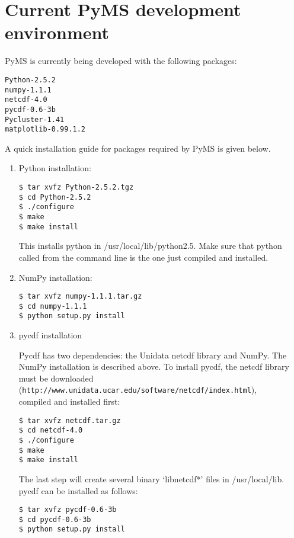 \section{Current PyMS development environment}

PyMS is currently being developed with the following packages:

\begin{verbatim}
Python-2.5.2
numpy-1.1.1
netcdf-4.0
pycdf-0.6-3b
Pycluster-1.41
matplotlib-0.99.1.2
\end{verbatim}

A quick installation guide for packages required by PyMS is given below.

\begin{enumerate}

\item Python installation:

\begin{verbatim}
$ tar xvfz Python-2.5.2.tgz
$ cd Python-2.5.2
$ ./configure
$ make
$ make install
\end{verbatim}

\noindent
This installs python in /usr/local/lib/python2.5.  Make sure that python called
from the command line is the one just compiled and installed.

\item NumPy installation:

\begin{verbatim}
$ tar xvfz numpy-1.1.1.tar.gz
$ cd numpy-1.1.1
$ python setup.py install
\end{verbatim}

\item pycdf installation

Pycdf has two dependencies: the Unidata netcdf library and NumPy. The NumPy
installation is described above. To install pycdf, the netcdf library must
be downloaded\\
({\tt http://www.unidata.ucar.edu/software/netcdf/index.html}),\\
compiled and installed first:

\begin{verbatim}
$ tar xvfz netcdf.tar.gz
$ cd netcdf-4.0
$ ./configure
$ make
$ make install
\end{verbatim}

The last step will create several binary `libnetcdf*' files in /usr/local/lib.
pycdf can be installed as follows:

\begin{verbatim}
$ tar xvfz pycdf-0.6-3b
$ cd pycdf-0.6-3b
$ python setup.py install
\end{verbatim}


\end{enumerate}
